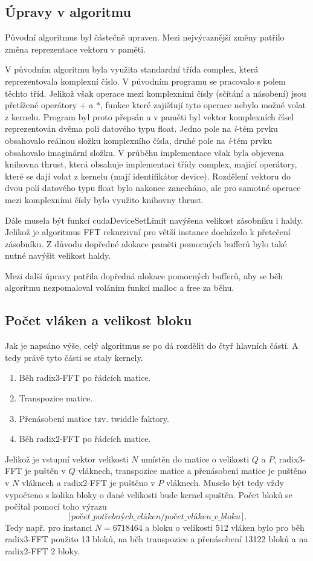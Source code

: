 \documentclass[12pt]{article}
\begin{document}
\subsection{Úpravy v algoritmu}
Původní algoritmus byl částečně upraven. Mezi nejvýraznější změny patřilo změna reprezentace vektoru v paměti. \par 
V původním algoritmu byla využita standardní třída complex, která reprezentovala komplexní číslo. V původním programu se pracovalo s polem těchto tříd. Jelikož však operace mezi komplexními čísly (sčítání a násobení) jsou přetížené operátory $+$ a $*$, funkce které zajišťují tyto operace nebylo možné volat z kernelu. Program byl proto přepsán a v paměti byl vektor komplexních čísel reprezentován dvěma poli datového typu float. Jedno pole na \textit{i}-tém prvku obsahovalo reálnou složku komplexního čísla, druhé pole na \textit{i}-tém prvku obsahovalo imaginární složku. V průběhu implementace však byla objevena knihovna thrust, která obsahuje implementaci třídy complex, mající operátory, které se dají volat z kernelu (mají identifikátor device). Rozdělení vektoru do dvou polí datového typu float bylo nakonec zanecháno, ale pro samotné operace mezi komplexními čísly bylo využito knihovny thrust.\par
Dále musela být funkcí cudaDeviceSetLimit navýšena velikost zásobníku i haldy. Jelikož je algoritmus FFT rekurzivní pro větší instance docházelo k přetečení zásobníku. Z důvodu dopředné alokace paměti pomocných bufferů bylo také nutné navýšit velikost haldy.
\par
Mezi další úpravy patřila dopředná alokace pomocných bufferů, aby se běh algoritmu nezpomaloval voláním funkcí malloc a free za běhu.
\subsection{Počet vláken a velikost bloku}
Jak je napsáno výše, celý algoritmus se po dá rozdělit do čtyř hlavních částí. A tedy právě tyto části se staly kernely.
\begin{enumerate}
	\item Běh radix3-FFT po řádcích matice.
	\item Transpozice matice.
	\item Přenásobení matice tzv. twiddle faktory.
	\item Běh radix2-FFT po řádcích matice. 
\end{enumerate}
Jelikož je vstupní vektor velikosti $N$ umístěn do matice o velikosti $Q$ a $P$, radix3-FFT je puštěn v $Q$ vláknech, transpozice matice a přenásobení matice je puštěno v $N$ vláknech a radix2-FFT je puštěno v $P$ vláknech. Muselo být tedy vždy vypočteno s kolika bloky o dané velikosti bude kernel spuštěn. Počet bloků se počítal pomocí toho výrazu   $$\lceil počet\_potřebných\_vláken / počet\_vláken\_v\_bloku \rceil.$$
Tedy např. pro instanci $N=6718464$ a bloku o velikosti 512 vláken bylo pro běh radix3-FFT použito 13 bloků, na běh transpozice a přenásobení 13122 bloků a na radix2-FFT 2 bloky.
\end{document}

